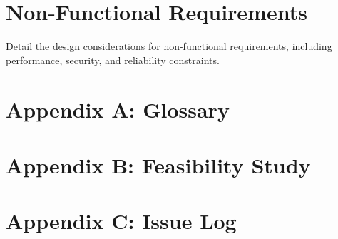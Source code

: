 \documentclass{article}
\begin{document}
\section{Non-Functional Requirements}
Detail the design considerations for non-functional requirements, including performance, security, and reliability constraints.

\appendix
\section{Appendix A: Glossary}
\section{Appendix B: Feasibility Study}
\section{Appendix C: Issue Log}
\end{document}
